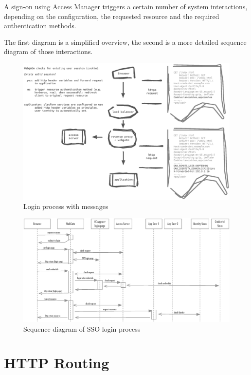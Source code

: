 \documentclass[11pt]{report}
\begin{document}
A sign-on using Access Manager triggers a certain number of system
interactions, depending on the configuration, the requested resource and the
required authentication methods.

The first diagram is a simplified overview, the second is a more detailed
sequence diagram of those interactions.


\begin{figure}[H]
    \centering
    \includegraphics[width=1\textwidth]{diag/msgdiag}
    \caption{Login process with messages}
\end{figure}


\begin{figure}[H]
    \centering
    \includegraphics[width=1\textwidth]{diag/seqdiag}
    \caption{Sequence diagram of SSO login process}
\end{figure}



\section{HTTP Routing}
\end{document}
